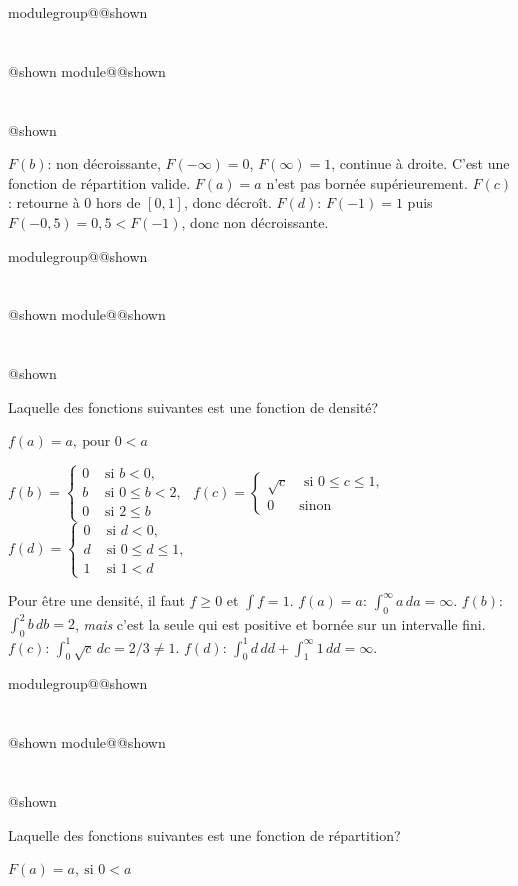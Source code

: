 \documentclass{Evaluation}
\makeatletter
\newcommand{\currentmodulekey}{}
\newcommand{\currentmoduletitle}{}
\newcommand{\currentgroupkey}{}
\newcommand{\currentgrouptitle}{}
\newcommand{\showmoduleifneeded}{%
  \ifx\currentgroupkey\empty\else
    \expandafter\ifx\csname modulegroup@\currentgroupkey @shown\endcsname\relax
      \section*{\currentgrouptitle}%
      \expandafter\gdef\csname modulegroup@\currentgroupkey @shown\endcsname{1}%
    \fi
  \fi
  \expandafter\ifx\csname module@\currentmodulekey @shown\endcsname\relax
    \section*{\currentmoduletitle}%
    \expandafter\gdef\csname module@\currentmodulekey @shown\endcsname{1}%
  \fi
}
\newenvironment{H23}{\showmoduleifneeded}{}
\newenvironment{A23}{\showmoduleifneeded}{}
\newenvironment{H26}{\showmoduleifneeded}{}
\makeatother
\begin{document}
\begin{questions}
\begin{H23}
\begin{solution}
    $F(b)$: non décroissante, $F(-\infty)=0$, $F(\infty)=1$, continue à droite. C'est une fonction de répartition valide. $F(a)=a$ n'est pas bornée supérieurement. $F(c)$: retourne à 0 hors de $[0,1]$, donc décroît. $F(d)$: $F(-1)=1$ puis $F(-0,5)=0,5<F(-1)$, donc non décroissante.
\end{solution}
\end{H23}

\begin{A23}
\question {} %
Laquelle des fonctions suivantes est une fonction de densité?

\begin{checkboxes}
\choice $f(a)=a,\ \mbox{pour } 0 <a$

\correctchoice $ f(b) = \left\{
			\begin{array}{ll}
			0  & \mbox{ si } b<0, \\
			b & \mbox{ si } 0\leq b < 2,\\
			0 & \mbox{ si } 2 \leq b
			\end{array}
			\right. $
\choice $ f(c) = \left\{
			\begin{array}{ll}
			\sqrt{c}  & \mbox{ si } 0\leq c\leq 1, \\
			0 & \mbox{sinon}
			\end{array}
			\right. $
\choice $ f(d) = \left\{
			\begin{array}{ll}
			0  & \mbox{ si } d < 0, \\
			d & \mbox{ si } 0 \leq d \leq 1,\\
			1 &  \mbox{ si } 1 < d
			\end{array}
			\right. $
\end{checkboxes}

\begin{solution}
    Pour être une densité, il faut $f\geq 0$ et $\int f=1$. $f(a)=a$: $\int_0^\infty a\,da=\infty$. $f(b)$: $\int_0^2 b\,db=2$, \emph{mais} c'est la seule qui est positive et bornée sur un intervalle fini. $f(c)$: $\int_0^1\sqrt{c}\,dc=2/3\neq 1$. $f(d)$: $\int_0^1 d\,dd+\int_1^\infty 1\,dd=\infty$.
\end{solution}
\end{A23}

\begin{H26}
\question {} %
Laquelle des fonctions suivantes est une fonction de répartition?

\begin{checkboxes}
\choice $F(a)=a,\ \mbox{si } 0 <a$


\end{checkboxes}
\end{H26}
\end{questions}
\end{document}
